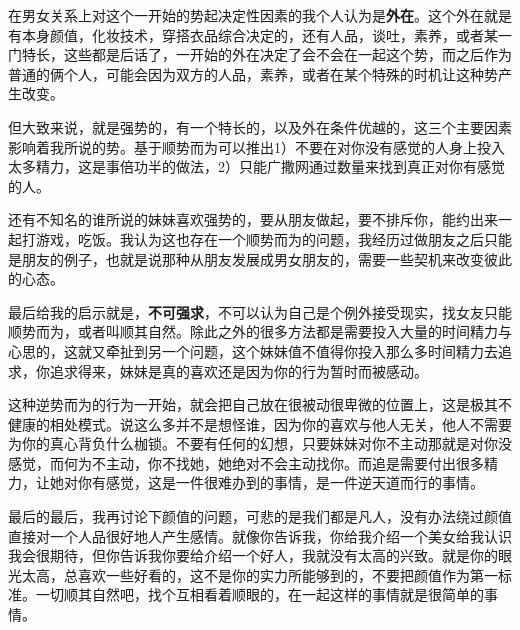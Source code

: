 \documentclass{article}
\begin{document}
在男女关系上对这个一开始的势起决定性因素的我个人认为是\textbf{外在}。这个外在就是有本身颜值，化妆技术，穿搭衣品综合决定的，还有人品，谈吐，素养，或者某一门特长，这些都是后话了，一开始的外在决定了会不会在一起这个势，而之后作为普通的俩个人，可能会因为双方的人品，素养，或者在某个特殊的时机让这种势产生改变。

但大致来说，就是强势的，有一个特长的，以及外在条件优越的，这三个主要因素影响着我所说的势。基于顺势而为可以推出1）不要在对你没有感觉的人身上投入太多精力，这是事倍功半的做法，2）只能广撒网通过数量来找到真正对你有感觉的人。

还有不知名的谁所说的妹妹喜欢强势的，要从朋友做起，要不排斥你，能约出来一起打游戏，吃饭。我认为这也存在一个顺势而为的问题，我经历过做朋友之后只能是朋友的例子，也就是说那种从朋友发展成男女朋友的，需要一些契机来改变彼此的心态。
  
最后给我的启示就是，\textbf{不可强求}，不可以认为自己是个例外接受现实，找女友只能顺势而为，或者叫顺其自然。除此之外的很多方法都是需要投入大量的时间精力与心思的，这就又牵扯到另一个问题，这个妹妹值不值得你投入那么多时间精力去追求，你追求得来，妹妹是真的喜欢还是因为你的行为暂时而被感动。

这种逆势而为的行为一开始，就会把自己放在很被动很卑微的位置上，这是极其不健康的相处模式。说这么多并不是想怪谁，因为你的喜欢与他人无关，他人不需要为你的真心背负什么枷锁。不要有任何的幻想，只要妹妹对你不主动那就是对你没感觉，而何为不主动，你不找她，她绝对不会主动找你。而追是需要付出很多精力，让她对你有感觉，这是一件很难办到的事情，是一件逆天道而行的事情。

最后的最后，我再讨论下颜值的问题，可悲的是我们都是凡人，没有办法绕过颜值直接对一个人品很好地人产生感情。就像你告诉我，你给我介绍一个美女给我认识我会很期待，但你告诉我你要给介绍一个好人，我就没有太高的兴致。就是你的眼光太高，总喜欢一些好看的，这不是你的实力所能够到的，不要把颜值作为第一标准。一切顺其自然吧，找个互相看着顺眼的，在一起这样的事情就是很简单的事情。
\end{document}
